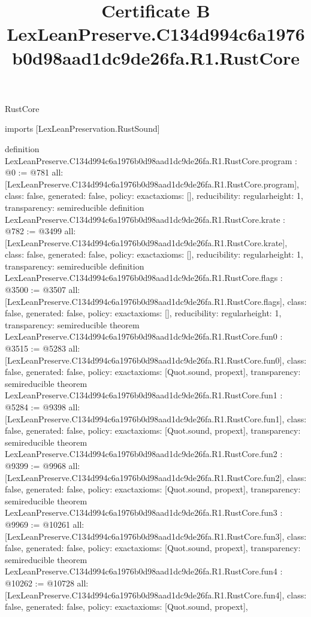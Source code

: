 \begin{lexlean}{RustCore}
\title{Certificate B LexLeanPreserve.C134d994c6a1976b0d98aad1dc9de26fa.R1.RustCore}
\begin{coremodule}
imports [LexLeanPreservation.RustSound]

definition LexLeanPreserve.C134d994c6a1976b0d98aad1dc9de26fa.R1.RustCore.program : @0 := @781 {
  all: [LexLeanPreserve.C134d994c6a1976b0d98aad1dc9de26fa.R1.RustCore.program],
  class: false,
  generated: false,
  policy: exact{axioms: []},
  reducibility: regular{height: 1},
  transparency: semireducible
}
definition LexLeanPreserve.C134d994c6a1976b0d98aad1dc9de26fa.R1.RustCore.krate : @782 := @3499 {
  all: [LexLeanPreserve.C134d994c6a1976b0d98aad1dc9de26fa.R1.RustCore.krate],
  class: false,
  generated: false,
  policy: exact{axioms: []},
  reducibility: regular{height: 1},
  transparency: semireducible
}
definition LexLeanPreserve.C134d994c6a1976b0d98aad1dc9de26fa.R1.RustCore.flags : @3500 := @3507 {
  all: [LexLeanPreserve.C134d994c6a1976b0d98aad1dc9de26fa.R1.RustCore.flags],
  class: false,
  generated: false,
  policy: exact{axioms: []},
  reducibility: regular{height: 1},
  transparency: semireducible
}
theorem LexLeanPreserve.C134d994c6a1976b0d98aad1dc9de26fa.R1.RustCore.fun0 : @3515 := @5283 {
  all: [LexLeanPreserve.C134d994c6a1976b0d98aad1dc9de26fa.R1.RustCore.fun0],
  class: false,
  generated: false,
  policy: exact{axioms: [Quot.sound, propext]},
  transparency: semireducible
}
theorem LexLeanPreserve.C134d994c6a1976b0d98aad1dc9de26fa.R1.RustCore.fun1 : @5284 := @9398 {
  all: [LexLeanPreserve.C134d994c6a1976b0d98aad1dc9de26fa.R1.RustCore.fun1],
  class: false,
  generated: false,
  policy: exact{axioms: [Quot.sound, propext]},
  transparency: semireducible
}
theorem LexLeanPreserve.C134d994c6a1976b0d98aad1dc9de26fa.R1.RustCore.fun2 : @9399 := @9968 {
  all: [LexLeanPreserve.C134d994c6a1976b0d98aad1dc9de26fa.R1.RustCore.fun2],
  class: false,
  generated: false,
  policy: exact{axioms: [Quot.sound, propext]},
  transparency: semireducible
}
theorem LexLeanPreserve.C134d994c6a1976b0d98aad1dc9de26fa.R1.RustCore.fun3 : @9969 := @10261 {
  all: [LexLeanPreserve.C134d994c6a1976b0d98aad1dc9de26fa.R1.RustCore.fun3],
  class: false,
  generated: false,
  policy: exact{axioms: [Quot.sound, propext]},
  transparency: semireducible
}
theorem LexLeanPreserve.C134d994c6a1976b0d98aad1dc9de26fa.R1.RustCore.fun4 : @10262 := @10728 {
  all: [LexLeanPreserve.C134d994c6a1976b0d98aad1dc9de26fa.R1.RustCore.fun4],
  class: false,
  generated: false,
  policy: exact{axioms: [Quot.sound, propext]},
}
\end{coremodule}
\end{lexlean}
